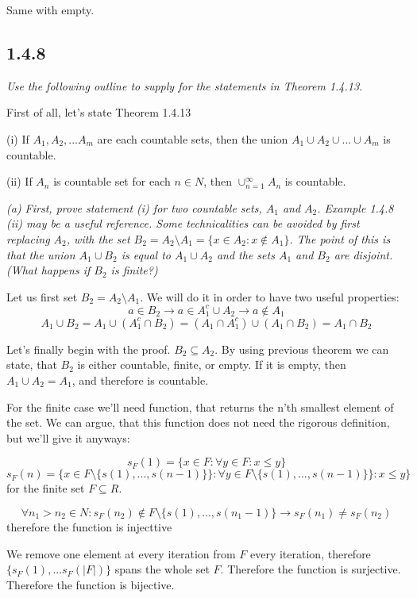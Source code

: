 \documentclass[11pt,oneside,titlepage]{book}
\begin{document}
Same with empty.

\subsection*{1.4.8}
\textit{Use the following outline to supply for the statements in Theorem
  1.4.13.}

First of all, let's state Theorem 1.4.13

(i) If $A_1, A_2,...A_m$ are each countable sets, then the union
$A_1 \cup A_2 \cup ... \cup A_m$ is countable.

(ii) If $A_n$ is countable set for each $n \in N$, then $\cup^{\infty}_{n = 1}
A_n$ is countable.

\textit{(a) First, prove statement (i) for two countable sets, $A_1$ and $A_2$.
  Example 1.4.8 (ii) may be a useful reference. Some technicalities can be
  avoided by first replacing $A_2$, with the set $B_2 = A_2 \setminus A_1
  = \{x \in A_2: x \notin A_1\}$. The point of this is that the union
  $A_1 \cup B_2$ is equal to $A_1 \cup A_2$ and the sets $A_1$ and $B_2$ are
  disjoint. (What happens if $B_2$ is finite?)}

Let us first set $B_2 = A_2 \setminus A_1$. We will do it in order to have two
useful properties:
$$a \in B_2 \to a \in A_1^c \cup A_2 \to a \notin A_1$$
$$A_1 \cup B_2 = A_1 \cup (A_1^c \cap B_2) = (A_1 \cap A_1^c) \cup (A_1 \cap
B_2) = A_1 \cap B_2$$

Let's finally begin with the proof.  $B_2 \subseteq A_2$. By using
previous theorem we can state, that $B_2$ is either countable, finite, or
empty. If it is empty, then $A_1 \cup A_2 = A_1$, and therefore is countable.

For the finite case we'll need function, that returns the n'th smallest
element of the set. We can argue, that this function does not need the
rigorous definition, but we'll give it anyways:

$$s_F(1) = \{x \in F: \forall y \in F: x \leq y\}$$
$$s_F(n) = \{x \in F \setminus \{s(1),...,s(n - 1)\}\}:
\forall y \in F \setminus \{s(1),...,s(n - 1)\}\}: x \leq y\}$$
for the finite set $F \subseteq R$.

$$\forall n_1 > n_2 \in N: s_F(n_2) \notin F \setminus \{s(1),...,s(n_1 - 1)\}
\to s_F(n_1) \neq s_F(n_2)$$
therefore the function is injecttive

We remove one element at every iteration from $F$ every iteration, therefore
$\{s_F(1),...s_F(|F|)\}$ spans the whole set $F$. Therefore the function is
surjective. Therefore the function is bijective.
\end{document}
